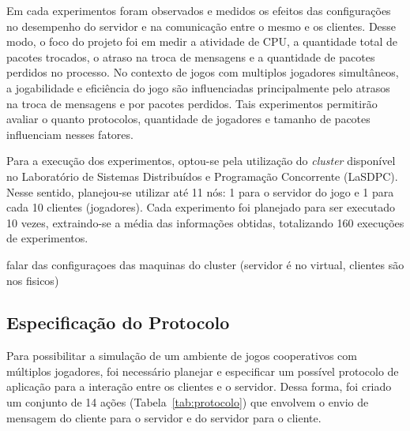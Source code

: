 \documentclass[12pt]{article}
\begin{document}
Em cada experimentos foram observados e medidos os efeitos das configurações no
desempenho do servidor e na comunicação entre o mesmo e os clientes. Desse
modo, o foco do projeto foi em medir a atividade de CPU, a quantidade total de
pacotes trocados, o atraso na troca de mensagens e a quantidade de pacotes
perdidos no processo. No contexto de jogos com multiplos jogadores simultâneos,
a jogabilidade e eficiência do jogo são influenciadas principalmente pelo
atrasos na troca de mensagens e por pacotes perdidos. Tais experimentos
permitirão avaliar o quanto protocolos, quantidade de jogadores e tamanho de
pacotes influenciam nesses fatores.

Para a execução dos experimentos, optou-se pela utilização do \textit{cluster}
disponível no Laboratório de Sistemas Distribuídos e Programação Concorrente
(LaSDPC). Nesse sentido, planejou-se utilizar até 11 nós: 1 para o servidor do
jogo e 1 para cada 10 clientes (jogadores). Cada experimento foi planejado para
ser executado 10 vezes, extraindo-se a média das informações obtidas,
totalizando 160 execuções de experimentos.

falar das configuraçoes das maquinas do cluster (servidor é no virtual, clientes são nos fisicos)

\subsection{Especificação do Protocolo} \label{sub:protocolo}

Para possibilitar a simulação de um ambiente de jogos cooperativos com
múltiplos jogadores, foi necessário planejar e especificar um possível
protocolo de aplicação para a interação entre os clientes e o servidor.  Dessa
forma, foi criado um conjunto de 14 ações (Tabela~\ref{tab:protocolo}) que
envolvem o envio de mensagem do cliente para o servidor e do servidor para o
cliente.
\end{document}
